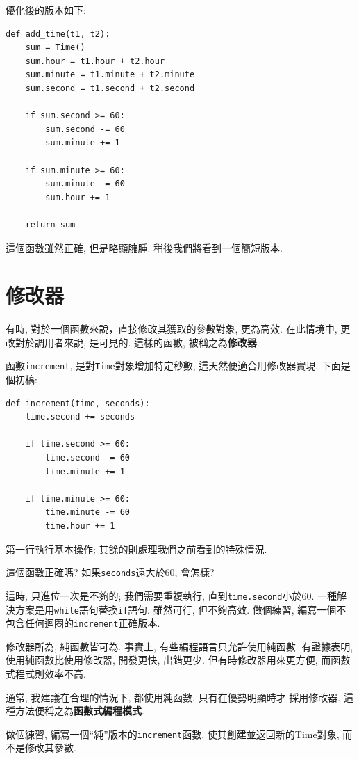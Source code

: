 \documentclass[10pt]{book}
\begin{document}
優化後的版本如下:

\begin{verbatim}
def add_time(t1, t2):
    sum = Time()
    sum.hour = t1.hour + t2.hour
    sum.minute = t1.minute + t2.minute
    sum.second = t1.second + t2.second

    if sum.second >= 60:
        sum.second -= 60
        sum.minute += 1

    if sum.minute >= 60:
        sum.minute -= 60
        sum.hour += 1

    return sum
\end{verbatim}
%
這個函數雖然正確, 但是略顯臃腫. 
稍後我們將看到一個簡短版本. 


\section{修改器}
\label{increment}

有時, 對於一個函數來說，直接修改其獲取的參數對象, 更為高效. 
在此情境中, 更改對於調用者來說, 是可見的. 
這樣的函數, 被稱之為{\bf 修改器}. 

函數{\tt increment}, 是對{\tt Time}對象增加特定秒數, 
這天然便適合用修改器實現. 
下面是個初稿:

\begin{verbatim}
def increment(time, seconds):
    time.second += seconds

    if time.second >= 60:
        time.second -= 60
        time.minute += 1

    if time.minute >= 60:
        time.minute -= 60
        time.hour += 1
\end{verbatim}
%
第一行執行基本操作;
其餘的則處理我們之前看到的特殊情況. 

這個函數正確嗎? 如果{\tt seconds}遠大於60, 會怎樣?

這時, 只進位一次是不夠的;
我們需要重複執行, 直到{\tt time.second}小於60.
一種解決方案是用{\tt while}語句替換{\tt if}語句. 
雖然可行, 但不夠高效. 
做個練習, 編寫一個不包含任何迴圈的{\tt increment}正確版本. 

修改器所為, 純函數皆可為. 
事實上, 有些編程語言只允許使用純函數. 
有證據表明, 使用純函數比使用修改器, 開發更快, 出錯更少. 
但有時修改器用來更方便, 而函數式程式則效率不高. 

通常, 我建議在合理的情況下, 都使用純函數, 只有在優勢明顯時才
採用修改器. 這種方法便稱之為{\bf 函數式編程模式}. 

做個練習, 編寫一個``純''版本的{\tt increment}函數, 使其創建並返回新的Time對象, 
而不是修改其參數. 
\end{document}
